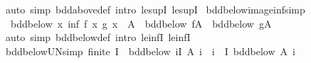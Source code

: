 \begin{isabellebody}
%
\isadelimproof
%
\endisadelimproof
%
\isatagproof
{}\isamarkupfalse%
\ {\isacharparenleft}{\kern0pt}auto\ simp{\isacharcolon}{\kern0pt}\ bdd{\isacharunderscore}{\kern0pt}above{\isacharunderscore}{\kern0pt}def\ intro{\isacharcolon}{\kern0pt}\ le{\isacharunderscore}{\kern0pt}supI{}\ le{\isacharunderscore}{\kern0pt}supI{}{\isacharparenright}{\kern0pt}%
\endisatagproof
{\isafoldproof}%
%
\isadelimproof
\isanewline
%
\endisadelimproof
\isanewline
{}\isamarkupfalse%
\ bdd{\isacharunderscore}{\kern0pt}below{\isacharunderscore}{\kern0pt}image{\isacharunderscore}{\kern0pt}inf{\isacharbrackleft}{\kern0pt}simp{\isacharbrackright}{\kern0pt}{\isacharcolon}{\kern0pt}\isanewline
\ \ {\isachardoublequoteopen}bdd{\isacharunderscore}{\kern0pt}below\ {\isacharparenleft}{\kern0pt}{\isacharparenleft}{\kern0pt}{\isasymlambda}x{\isachardot}{\kern0pt}\ inf\ {\isacharparenleft}{\kern0pt}f\ x{\isacharparenright}{\kern0pt}\ {\isacharparenleft}{\kern0pt}g\ x{\isacharparenright}{\kern0pt}{\isacharparenright}{\kern0pt}\ {\isacharbackquote}{\kern0pt}\ A{\isacharparenright}{\kern0pt}\ {\isasymlongleftrightarrow}\ bdd{\isacharunderscore}{\kern0pt}below\ {\isacharparenleft}{\kern0pt}f{\isacharbackquote}{\kern0pt}A{\isacharparenright}{\kern0pt}\ {\isasymand}\ bdd{\isacharunderscore}{\kern0pt}below\ {\isacharparenleft}{\kern0pt}g{\isacharbackquote}{\kern0pt}A{\isacharparenright}{\kern0pt}{\isachardoublequoteclose}\isanewline
%
\isadelimproof
%
\endisadelimproof
%
\isatagproof
{}\isamarkupfalse%
\ {\isacharparenleft}{\kern0pt}auto\ simp{\isacharcolon}{\kern0pt}\ bdd{\isacharunderscore}{\kern0pt}below{\isacharunderscore}{\kern0pt}def\ intro{\isacharcolon}{\kern0pt}\ le{\isacharunderscore}{\kern0pt}infI{}\ le{\isacharunderscore}{\kern0pt}infI{}{\isacharparenright}{\kern0pt}%
\endisatagproof
{\isafoldproof}%
%
\isadelimproof
\isanewline
%
\endisadelimproof
\isanewline
{}\isamarkupfalse%
\ bdd{\isacharunderscore}{\kern0pt}below{\isacharunderscore}{\kern0pt}UN{\isacharbrackleft}{\kern0pt}simp{\isacharbrackright}{\kern0pt}{\isacharcolon}{\kern0pt}\ {\isachardoublequoteopen}finite\ I\ {\isasymLongrightarrow}\ bdd{\isacharunderscore}{\kern0pt}below\ {\isacharparenleft}{\kern0pt}{\isasymUnion}i{\isasymin}I{\isachardot}{\kern0pt}\ A\ i{\isacharparenright}{\kern0pt}\ {\isacharequal}{\kern0pt}\ {\isacharparenleft}{\kern0pt}{\isasymforall}i\ {\isasymin}\ I{\isachardot}{\kern0pt}\ bdd{\isacharunderscore}{\kern0pt}below\ {\isacharparenleft}{\kern0pt}A\ i{\isacharparenright}{\kern0pt}{\isacharparenright}{\kern0pt}{\isachardoublequoteclose}\isanewline

\end{isabellebody}
